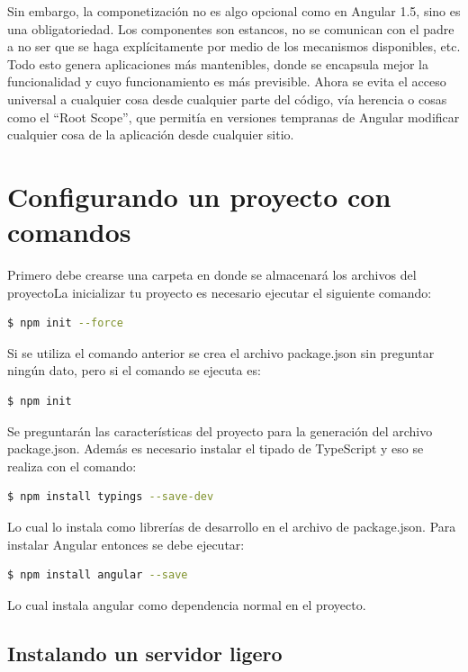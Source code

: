 \documentclass[12pt,twoside]{book}
\begin{document}
Sin embargo, la componetización no es algo opcional como en Angular 1.5, sino es una obligatoriedad. Los componentes son estancos, no se comunican con el padre a no ser que se haga explícitamente por medio de los mecanismos disponibles, etc. Todo esto genera aplicaciones más mantenibles, donde se encapsula mejor la funcionalidad y cuyo funcionamiento es más previsible. Ahora se evita el acceso universal a cualquier cosa desde cualquier parte del código, vía herencia o cosas como el ``Root Scope'', que permitía en versiones tempranas de Angular modificar cualquier cosa de la aplicación desde cualquier sitio.
\section{Configurando un proyecto con comandos}

Primero debe crearse una carpeta en donde se almacenará los archivos del proyectoLa inicializar tu proyecto es necesario ejecutar el siguiente comando:

\begin{lstlisting}[language=bash]
$ npm init --force
\end{lstlisting}

Si se utiliza el comando anterior se crea el archivo package.json sin preguntar ningún dato, pero si el comando se ejecuta es:

\begin{lstlisting}[language=bash]
$ npm init 
\end{lstlisting}

Se  preguntarán  las características del proyecto para la generación del archivo package.json. Además es necesario instalar el tipado de TypeScript y eso se realiza con el comando:

\begin{lstlisting}[language=bash]
$ npm install typings --save-dev
\end{lstlisting}
Lo cual lo instala como librerías de desarrollo en el archivo de package.json. Para instalar Angular entonces se debe ejecutar:

\begin{lstlisting}[language=bash]
$ npm install angular --save
\end{lstlisting}

Lo cual instala angular como dependencia normal en el proyecto.

\subsection{Instalando un servidor ligero}
\end{document}
